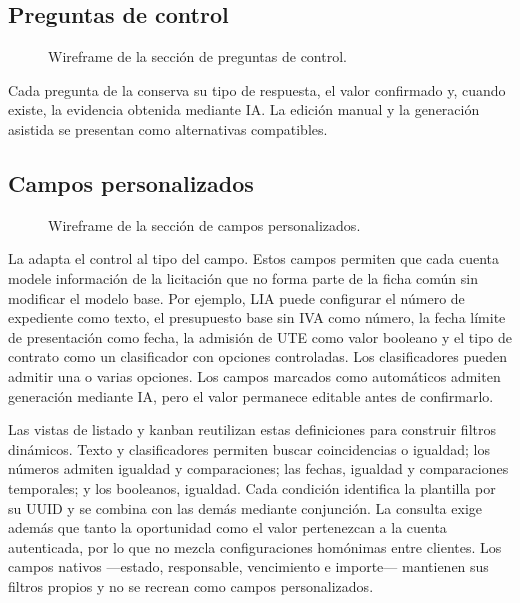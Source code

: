 \subsection{Preguntas de control}

\begin{figure}[H]
  \centering
  \resizebox{\textwidth}{!}{
    
  }
  \caption{Wireframe de la sección de preguntas de control.}
  \label{fig:wireframe-qualification-questions}
\end{figure}

Cada pregunta de la  conserva su
tipo de respuesta, el valor confirmado y, cuando existe, la evidencia obtenida
mediante IA. La edición manual y la generación asistida se presentan como
alternativas compatibles.

\subsection{Campos personalizados}

\begin{figure}[H]
  \centering
  \resizebox{\textwidth}{!}{
    
  }
  \caption{Wireframe de la sección de campos personalizados.}
  \label{fig:wireframe-qualification-fields}
\end{figure}

La  adapta el control al tipo del
campo. Estos campos permiten que cada cuenta modele información de la
licitación que no forma parte de la ficha común sin modificar el modelo base.
Por ejemplo, LIA puede configurar el número de expediente como texto, el
presupuesto base sin IVA como número, la fecha límite de presentación como
fecha, la admisión de UTE como valor booleano y el tipo de contrato como un
clasificador con opciones controladas. Los clasificadores pueden admitir una o
varias opciones. Los campos marcados como automáticos admiten generación
mediante IA, pero el valor permanece editable antes de confirmarlo.

Las vistas de listado y kanban reutilizan estas definiciones para construir
filtros dinámicos. Texto y clasificadores permiten buscar coincidencias o
igualdad; los números admiten igualdad y comparaciones; las fechas, igualdad y
comparaciones temporales; y los booleanos, igualdad. Cada condición identifica
la plantilla por su UUID y se combina con las demás mediante conjunción. La
consulta exige además que tanto la oportunidad como el valor pertenezcan a la
cuenta autenticada, por lo que no mezcla configuraciones homónimas entre
clientes. Los campos nativos ---estado, responsable, vencimiento e importe---
mantienen sus filtros propios y no se recrean como campos personalizados.


